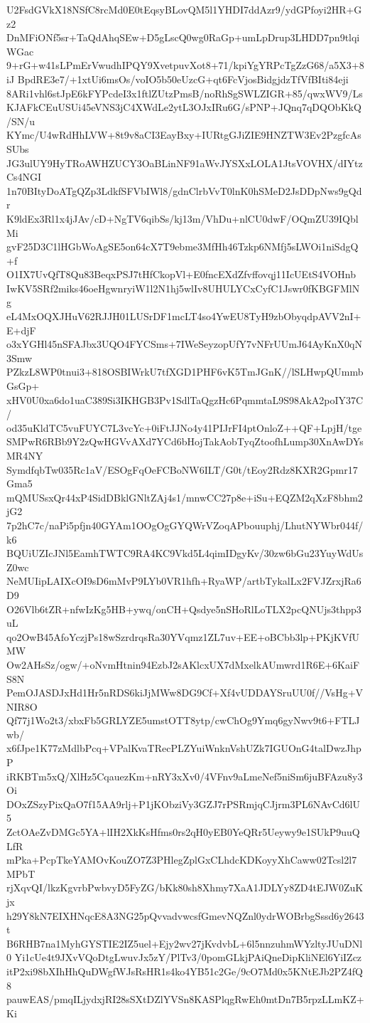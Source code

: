 U2FsdGVkX18NSfC8rcMd0E0tEqsyBLovQM5l1YHDI7ddAzr9/ydGPfoyi2HR+Gz2
DnMFiONf5sr+TaQdAhqSEw+D5gLscQ0wg0RaGp+umLpDrup3LHDD7pn9tlqiWGac
9+rG+w41sLPmErVwudhIPQY9XvetpuvXot8+71/kpiYgYRPcTgZzG68/a5X3+8iJ
BpdRE3e7/+1xtUi6msOs/voIO5b50eUzcG+qt6FcVjosBidgjdzTfVfBIti84eji
8ARi1vhl6stJpE6kFYPcdeI3x1ftlZUtzPmsB/noRhSgSWLZIGR+85/qwxWV9/Ls
KJAFkCEuUSUi45eVNS3jC4XWdLe2ytL3OJxIRu6G/sPNP+JQnq7qDQObKkQ/SN/u
KYmc/U4wRdHhLVW+8t9v8aCI3EayBxy+IURtgGJiZIE9HNZTW3Ev2PzgfcAsSUbs
JG3ulUY9HyTRoAWHZUCY3OaBLinNF91aWvJYSXxLOLA1JtsVOVHX/dIYtzCs4NGI
1n70BItyDoATgQZp3LdkfSFVbIWl8/gdnClrbVvT0lnK0hSMeD2JsDDpNws9gQdr
K9ldEx3Rl1x4jJAv/cD+NgTV6qibSs/kj13m/VhDu+nlCU0dwF/OQmZU39IQblMi
gvF25D3C1lHGbWoAgSE5on64cX7T9ebme3MfHh46Tzkp6NMfj5sLWOi1niSdgQ+f
O1IX7UvQfT8Qu83BeqxPSJ7tHfCkopVl+E0fncEXdZfvffovqj11IcUEtS4VOHnb
IwKV5SRf2miks46oeHgwnryiW1l2N1hj5wlIv8UHULYCxCyfC1Jswr0fKBGFMlNg
eL4MxOQXJHuV62RJJH01LUSrDF1mcLT4so4YwEU8TyH9zbObyqdpAVV2nI+E+djF
o3xYGHl45nSFAJbx3UQO4FYCSms+7IWeSeyzopUfY7vNFrUUmJ64AyKnX0qN3Smw
PZkzL8WP0tnui3+818OSBIWrkU7tfXGD1PHF6vK5TmJGnK//lSLHwpQUmmbGsGp+
xHV0U0xa6do1uaC389Si3IKHGB3Pv1SdlTaQgzHc6PqmmtaL9S98AkA2poIY37C/
od35uKldTC5vuFUYC7L3vcYc+0iFtJJNo4y41PIJrFI4ptOnloZ++QF+LpjH/tge
SMPwR6RBb9Y2zQwHGVvAXd7YCd6bHojTakAobTyqZtoofhLump30XnAwDYsMR4NY
SymdfqbTw035Rc1aV/ESOgFqOeFCBoNW6ILT/G0t/tEoy2Rdz8KXR2Gpmr17Gma5
mQMUSsxQr44xP4SidDBklGNltZAj4s1/mnwCC27p8e+iSu+EQZM2qXzF8bhm2jG2
7p2hC7c/naPi5pfjn40GYAm1OOgOgGYQWrVZoqAPbouuphj/LhutNYWbr044f/k6
BQUiUZIcJNl5EamhTWTC9RA4KC9Vkd5L4qimIDgyKv/30zw6bGu23YuyWdUsZ0wc
NeMUIipLAIXcOI9sD6mMvP9LYb0VR1hfh+RyaWP/artbTykalLx2FVJZrxjRa6D9
O26Vlb6tZR+nfwIzKg5HB+ywq/onCH+Qsdye5nSHoRlLoTLX2pcQNUjs3thpp3uL
qo2OwB45AfoYczjPs18wSzrdrqsRa30YVqmz1ZL7uv+EE+oBCbb3lp+PKjKVfUMW
Ow2AHsSz/ogw/+oNvmHtnin94EzbJ2sAKlcxUX7dMxelkAUmwrd1R6E+6KaiFS8N
PemOJASDJxHd1Hr5nRDS6kiJjMWw8DG9Cf+Xf4vUDDAYSruUU0f//VsHg+VNIR8O
Qf77j1Wo2t3/xbxFb5GRLYZE5umstOTT8ytp/cwChOg9Ymq6gyNwv9t6+FTLJwb/
x6fJpe1K77zMdlbPcq+VPalKvaTRecPLZYuiWnknVshUZk7IGUOnG4talDwzJhpP
iRKBTm5xQ/XlHz5CqauezKm+nRY3xXv0/4VFnv9aLmeNef5niSm6juBFAzu8y3Oi
DOxZSzyPixQaO7f15AA9rlj+P1jKObziVy3GZJ7rPSRmjqCJjrm3PL6NAvCd6lU5
ZctOAeZvDMGc5YA+lIH2XkKsHfms0rs2qH0yEB0YeQRr5Ueywy9e1SUkP9uuQLfR
mPka+PcpTkeYAMOvKouZO7Z3PHlegZplGxCLhdcKDKoyyXhCaww02Tcsl2l7MPbT
rjXqvQI/lkzKgvrbPwbvyD5FyZG/bKk80sh8Xhmy7XaA1JDLYy8ZD4tEJW0ZuKjx
h29Y8kN7EIXHNqcE8A3NG25pQvvadvwcsfGmevNQZnl0ydrWOBrbgSssd6y2643t
B6RHB7na1MyhGYSTIE2IZ5uel+Ejy2wv27jKvdvbL+6l5nnzuhmWYzltyJUuDNl0
Yi1cUe4t9JXvVQoDtgLwuvJx5zY/PlTv3/0pomGLkjPAiQneDipKliNEl6YiIZcz
itP2xi98bXIhHhQuDWgfWJsRsHR1s4ko4YB51c2Ge/9cO7Md0x5KNtEJb2PZ4fQ8
pauwEAS/pmqILjydxjRI28sSXtDZlYVSn8KASPlqgRwEh0mtDn7B5rpzLLmKZ+Ki
